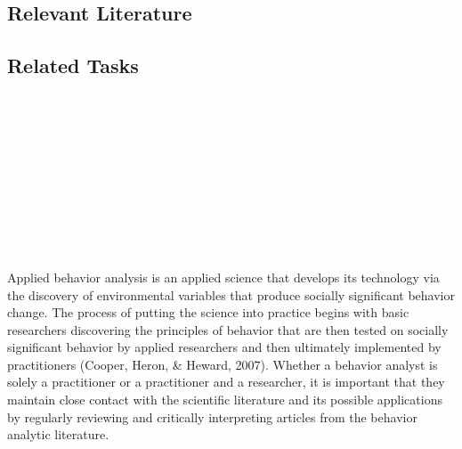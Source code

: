 \subsection{Relevant Literature}
\begin{refsection}
\nocite{test,alang2017police,clayton2018black}
\printbibliography[heading=none]
\end{refsection}
%
\subsection{Related Tasks}
\fourbFour{}\\
\fourbFive{}\\
\fourbSix{}\\
\fourbSeven{}\\
\fourbNine{}\\
\fourbEleven{}\\
\fourhFour{}\\
\fouriOne{}\\
%
%
%
%
%
\section[\fourbTwo{}]{\fourbTwo{}%
              }
Applied behavior analysis is an applied science that develops its technology via the discovery of environmental variables that produce socially significant behavior change. The process of putting the science into practice begins with basic researchers discovering the principles of behavior that are then tested on socially significant behavior by applied researchers and then ultimately implemented by practitioners (Cooper, Heron, \& Heward, 2007). Whether a behavior analyst is solely a practitioner or a practitioner and a researcher, it is important that they maintain close contact with the scientific literature and its possible applications by regularly reviewing and critically interpreting articles from the behavior analytic literature.

